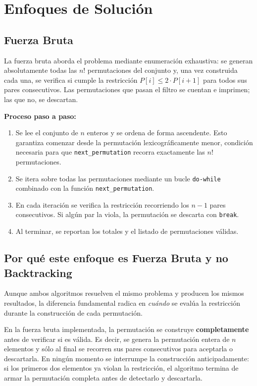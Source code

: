 \documentclass[12pt, a4paper]{article}
\begin{document}
\section{Enfoques de Solución}

\subsection{Fuerza Bruta}

La fuerza bruta aborda el problema mediante enumeración exhaustiva: se generan
absolutamente todas las $n!$ permutaciones del conjunto y, una vez construida cada
una, se verifica si cumple la restricción $P[i] \leq 2 \cdot P[i+1]$ para todos sus pares
consecutivos. Las permutaciones que pasan el filtro se cuentan e imprimen; las que
no, se descartan.

\textbf{Proceso paso a paso:}
\begin{enumerate}
  \item Se lee el conjunto de $n$ enteros y se ordena de forma ascendente. Esto
        garantiza comenzar desde la permutación lexicográficamente menor, condición
        necesaria para que \texttt{next\_permutation} recorra exactamente las $n!$ permutaciones.
  \item Se itera sobre todas las permutaciones mediante un bucle \texttt{do-while}
        combinado con la función \texttt{next\_permutation}.
  \item En cada iteración se verifica la restricción recorriendo los $n-1$ pares
        consecutivos. Si algún par la viola, la permutación se descarta con \texttt{break}.
  \item Al terminar, se reportan los totales y el listado de permutaciones válidas.
\end{enumerate}

\subsection{Por qué este enfoque es Fuerza Bruta y no Backtracking}

Aunque ambos algoritmos resuelven el mismo problema y producen los mismos
resultados, la diferencia fundamental radica en \textit{cuándo} se evalúa la restricción
durante la construcción de cada permutación.

En la fuerza bruta implementada, la permutación se construye \textbf{completamente}
antes de verificar si es válida. Es decir, se genera la permutación entera de $n$
elementos y sólo al final se recorren sus pares consecutivos para aceptarla o
descartarla. En ningún momento se interrumpe la construcción anticipadamente: si los
primeros dos elementos ya violan la restricción, el algoritmo termina de armar la
permutación completa antes de detectarlo y descartarla.
\end{document}

